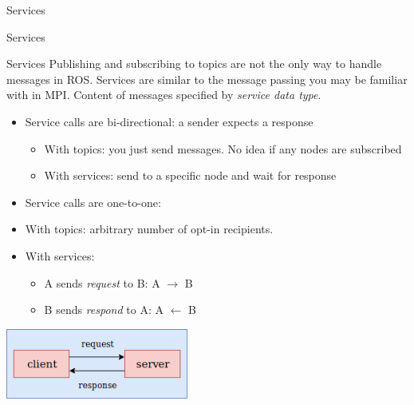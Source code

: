 \documentclass[9pt]{beamer}
\begin{document}
\begin{section}{Services}
    \begin{frame}{Services}
        \begin{block}{Services}
            Publishing and subscribing to topics are not the only way to handle messages in ROS. 
            Services are similar to the message passing you may be familiar with in MPI. Content of messages specified by \textit{service data type}. 
        \end{block}
        \begin{itemize}
            \item Service calls are bi-directional: a sender expects a response
            \begin{itemize}
                \item With topics: you just send messages. No idea if any nodes are subscribed
                \item With services: send to a specific node and wait for response
            \end{itemize}
            \item Service calls are one-to-one: 
                \item With topics: arbitrary number of opt-in recipients. 
                \item With services: 
                \begin{itemize}
                    \item A sends \textit{request} to B: A $\rightarrow$ B
                    \item B sends \textit{respond} to A: A $\leftarrow$ B
                \end{itemize}
        \end{itemize}
        \includegraphics[width=0.45\textwidth,trim={0cm 0cm 0cm 0cm},clip]{img/services.png}
    \end{frame}
    

\end{section}
\end{document}
